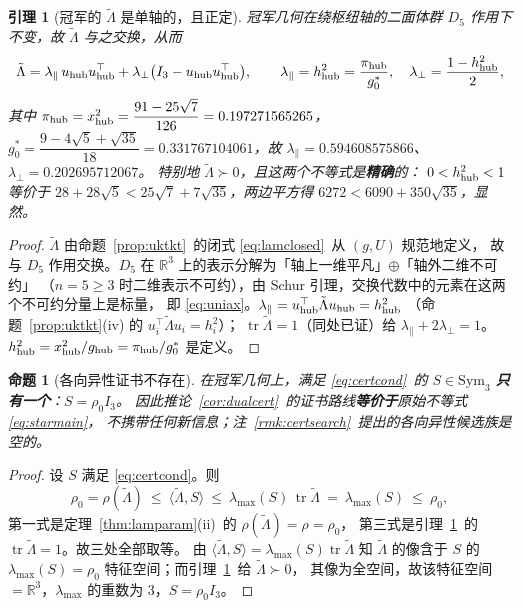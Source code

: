 \documentclass[UTF8,11pt]{ctexart}
\newtheorem{proposition}[theorem]{命题}
\newtheorem{lemma}[theorem]{引理}
\theoremstyle{definition}
\newcommand{\Lam}{\Lambda}
\newcommand{\tr}{\operatorname{tr}}
\newcommand{\R}{\mathbb{R}}
\begin{document}
\begin{lemma}[冠军的 $\tilde\Lam$ 是单轴的，且正定]\label{lem:lampos}
冠军几何在绕枢纽轴的二面体群 $D_5$ 作用下不变，故 $\tilde\Lam$ 与之交换，从而
\begin{equation}\label{eq:uniax}
\tilde\Lam=\lambda_\parallel\,u_{\rm hub}u_{\rm hub}^\top+\lambda_\perp\bigl(I_3-u_{\rm hub}u_{\rm hub}^\top\bigr),
\qquad
\lambda_\parallel=h_{\rm hub}^2=\frac{\pi_{\rm hub}}{g_0^*},\quad
\lambda_\perp=\frac{1-h_{\rm hub}^2}{2},
\end{equation}
其中 $\pi_{\rm hub}=x_{\rm hub}^2=\dfrac{91-25\sqrt7}{126}=0.197271565265$，
$g_0^*=\dfrac{9-4\sqrt5+\sqrt{35}}{18}=0.331767104061$，故
$\lambda_\parallel=0.594608575866$、$\lambda_\perp=0.202695712067$。
特别地 $\tilde\Lam\succ0$，且这两个不等式是\textbf{精确}的：
$0<h_{\rm hub}^2<1$ 等价于 $28+28\sqrt5<25\sqrt7+7\sqrt{35}$，两边平方得 $6272<6090+350\sqrt{35}$，显然。
\end{lemma}

\begin{proof}
$\tilde\Lam$ 由命题~\ref{prop:uktkt}~的闭式 \eqref{eq:lamclosed}~从 $(g,U)$ 规范地定义，
故与 $D_5$ 作用交换。$D_5$ 在 $\R^3$ 上的表示分解为「轴上一维平凡」$\oplus$「轴外二维不可约」
（$n=5\ge3$ 时二维表示不可约），由 Schur 引理，交换代数中的元素在这两个不可约分量上是标量，
即 \eqref{eq:uniax}。$\lambda_\parallel=u_{\rm hub}^\top\tilde\Lam u_{\rm hub}=h_{\rm hub}^2$
（命题~\ref{prop:uktkt}(iv) 的 $u_i^\top\tilde\Lam u_i=h_i^2$）；
$\tr\tilde\Lam=1$（同处已证）给 $\lambda_\parallel+2\lambda_\perp=1$。
$h_{\rm hub}^2=x_{\rm hub}^2/g_{\rm hub}=\pi_{\rm hub}/g_0^*$ 是定义。
\end{proof}

\begin{proposition}[各向异性证书不存在]\label{prop:P1dead}
在冠军几何上，满足 \eqref{eq:certcond}~的 $S\in\mathrm{Sym}_3$ \textbf{只有一个}：$S=\rho_0I_3$。
因此推论~\ref{cor:dualcert}~的证书路线\textbf{等价于}原始不等式 \eqref{eq:starmain}，
不携带任何新信息；注~\ref{rmk:certsearch}~提出的各向异性候选族是空的。
\end{proposition}

\begin{proof}
设 $S$ 满足 \eqref{eq:certcond}。则
\[
\rho_0=\rho(\tilde\Lam)\ \le\ \langle\tilde\Lam,S\rangle\ \le\ \lambda_{\max}(S)\,\tr\tilde\Lam
\ =\ \lambda_{\max}(S)\ \le\ \rho_0 ,
\]
第一式是定理~\ref{thm:lamparam}(ii)~的 $\rho(\tilde\Lam)=\rho=\rho_0$，
第三式是引理~\ref{lem:lampos}~的 $\tr\tilde\Lam=1$。故三处全部取等。
由 $\langle\tilde\Lam,S\rangle=\lambda_{\max}(S)\tr\tilde\Lam$ 知 $\tilde\Lam$ 的像含于 $S$ 的
$\lambda_{\max}(S)=\rho_0$ 特征空间；而引理~\ref{lem:lampos}~给 $\tilde\Lam\succ0$，
其像为全空间，故该特征空间 $=\R^3$，$\lambda_{\max}$ 的重数为 $3$，$S=\rho_0I_3$。
\end{proof}
\end{document}

